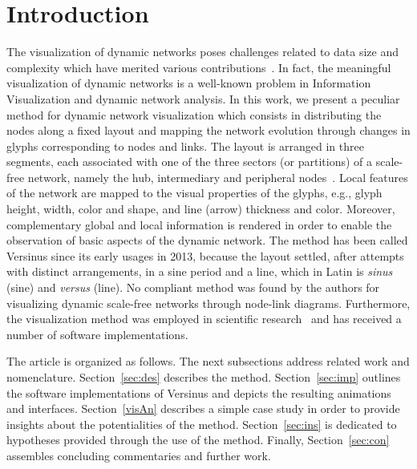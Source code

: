 \documentclass[runningheads]{llncs}
\begin{document}
\section{Introduction}
The visualization of dynamic networks poses challenges related to data size and
complexity which have merited various
contributions~\cite{evo1,evo3,hajij,evo2}.  In fact, the meaningful
visualization of dynamic networks is a well-known problem in Information
Visualization and dynamic network analysis.
In this work, we present a peculiar
method for dynamic network visualization which consists in distributing the
nodes along a fixed layout and mapping the network evolution through changes in
glyphs corresponding to nodes and links.
The layout is arranged in three segments, each associated with one of the three
sectors (or partitions) of a scale-free network, namely the hub,
intermediary and peripheral nodes~\cite{stab}.
Local features of the network are mapped to the visual properties of the glyphs,
e.g., glyph height, width, color and shape, and line (arrow)
thickness and color. Moreover, complementary global and local
information is rendered in order to enable the observation of basic aspects
of the dynamic network.
The method has been called Versinus since its early usages in 2013,
because the layout settled, after attempts with distinct arrangements, in a
sine period and a line, which in Latin is \emph{sinus} (sine) and \emph{versus}
(line).
No compliant method was found by the authors
for visualizing dynamic scale-free networks through node-link
diagrams.  Furthermore, the visualization method was employed in scientific
research~\cite{thesis,stab} and has received a number of software implementations.


The article is organized as follows. The next subsections address related work and nomenclature. Section~\ref{sec:des} describes the method. Section~\ref{sec:imp} outlines the software implementations of Versinus and depicts the resulting animations and interfaces. Section~\ref{visAn} describes a simple case study in order to provide insights about the potentialities of the method. Section~\ref{sec:ins} is dedicated to hypotheses provided through the use of the method. Finally, Section~\ref{sec:con} assembles concluding commentaries and further work.
\end{document}
